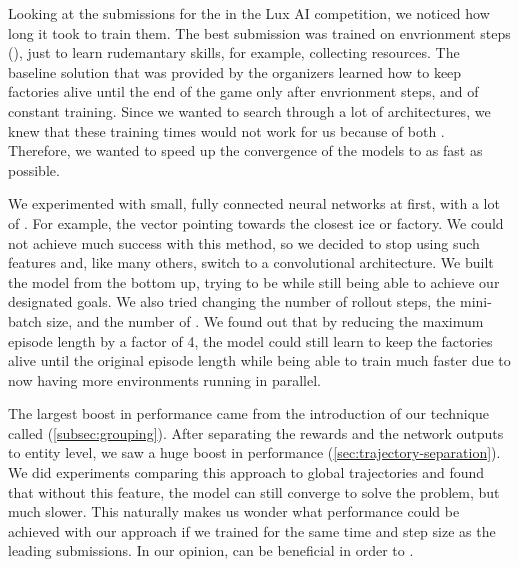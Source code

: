 \noindent Looking at the submissions for the  in the Lux AI competition, we noticed how long it took to train them. The best submission was trained on  envrionment steps (\cite{ferdinand}), just to learn rudemantary skills, for example, collecting resources. The baseline solution that was provided by the organizers learned how to keep factories alive until the end of the game only after  envrionment steps, and  of constant training. Since we wanted to search through a lot of architectures, we knew that these training times would not work for us because of both . Therefore, we wanted to speed up the convergence of the models to as fast as possible.

\bigskip

\noindent We experimented with small, fully connected neural networks at first, with a lot of . For example, the vector pointing towards the closest ice or factory. We could not achieve much success with this method, so we decided to stop using such features and, like many others, switch to a convolutional architecture. We built the model from the bottom up, trying to be  while still being able to achieve our designated goals. We also tried changing the number of rollout steps, the mini-batch size, and the number of . We found out that by reducing the maximum episode length by a factor of 4, the model could still learn to keep the factories alive until the original episode length while being able to train much faster due to now having more environments running in parallel.

\bigskip

\noindent The largest boost in performance came from the introduction of our technique called  (\autoref{subsec:grouping}). After separating the rewards and the network outputs to entity level, we saw a huge boost in performance (\autoref{sec:trajectory-separation}). We did experiments comparing this approach to global trajectories and found that without this feature, the model can still converge to solve the problem, but much slower. This naturally makes us wonder what performance could be achieved with our approach if we trained for the same time and step size as the leading submissions. In our opinion,  can be beneficial in order to .

